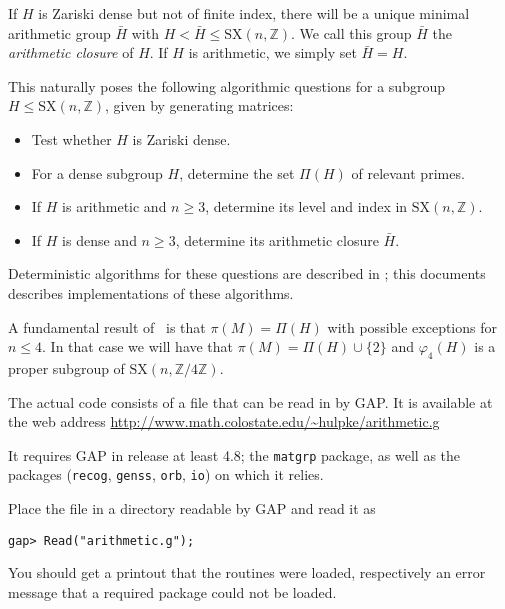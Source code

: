 \documentclass[a4paper,12pt]{amsart}
\newcommand{\Z}{\mathbb{Z}}
\newcommand{\SX}{\mathrm{SX}}
\begin{document}
If $H$ is Zariski dense but not of finite index, there will be a unique
minimal arithmetic group $\bar H$ with $H<\bar H\le\SX(n,\Z)$. We call this
group $\bar H$ the {\em arithmetic closure} of $H$. If $H$ is arithmetic, we
simply set $\bar H=H$.

This naturally poses the following algorithmic questions for a subgroup $H
\leq \SX(n,\Z)$, given by generating matrices: 
\begin{itemize}
\item Test whether $H$ is Zariski dense.
\item For a dense subgroup $H$, determine the set $\Pi(H)$ of relevant
primes.
\item If $H$ is arithmetic and $n\ge 3$, determine its level and index in
$\SX(n,\Z)$.
\item If $H$ is dense and $n\ge 3$, determine its arithmetic closure $\bar{H}$.
\end{itemize}
Deterministic algorithms for these questions are described in
\cite{Arithm,Density, MFO}; this documents describes implementations of
these algorithms.
\medskip


A fundamental result of~\cite{Density} is that $\pi(M) = \Pi(H)$ with possible exceptions for $n\le 4$.
In that case we will have that $\pi(M)=\Pi(H)\cup\{2\}$ and $\varphi_4(H)$ is a proper
subgroup of $\SX(n,\Z/4\Z)$.

\bigskip

The actual code consists of a file that can be read in by {\sf GAP}. It is
available at the web address
\url{http://www.math.colostate.edu/~hulpke/arithmetic.g} 

It requires {\sf
GAP} in release at least 4.8; the
{\tt matgrp} package, as well as the packages ({\tt recog}, {\tt genss},
{\tt orb}, {\tt io}) on which it relies.

Place the file in a directory readable by {\sf GAP} and read it as
\begin{verbatim}
gap> Read("arithmetic.g");
\end{verbatim}
You should get a printout that the routines were loaded, respectively an
error message that a required package could not be loaded.
\bigskip
\end{document}
